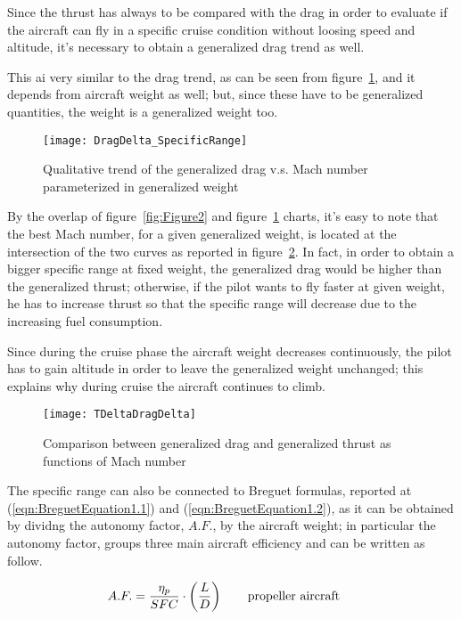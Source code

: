 \bigskip
\noindent
Since the thrust has always to be compared with the drag in order to evaluate if the aircraft can fly in a specific cruise condition without loosing speed and altitude, it's necessary to obtain a generalized drag trend as well. 

This ai very similar to the drag trend, as can be seen from figure~\ref{fig:Figure3}, and it depends from aircraft weight as well; but, since these have to be generalized quantities, the weight is a generalized weight too.

\begin{figure}[b]
\centering
\texttt{[image: DragDelta\_SpecificRange]}
\caption{Qualitative trend of the generalized drag v.s. Mach number parameterized in generalized weight}
\label{fig:Figure3}
\end{figure}

\bigskip
\noindent
By the overlap of figure~\ref{fig:Figure2} and figure~\ref{fig:Figure3} charts, it's easy to note that the best Mach number, for a given generalized weight, is located at the intersection of the two curves as reported in figure~\ref{fig:Figure4}. In fact, in order to obtain a bigger specific range at fixed weight, the generalized drag would be higher than the generalized thrust; otherwise, if the pilot wants to fly faster at given weight, he has to increase thrust so that the specific range will decrease due to the increasing fuel consumption.

Since during the cruise phase the aircraft weight decreases continuously, the pilot has to gain altitude in order to leave the generalized weight unchanged; this explains why during cruise the aircraft continues to climb. 

\begin{figure}[t]
\centering
\texttt{[image: TDeltaDragDelta]}
\caption{Comparison between generalized drag and generalized thrust as functions of Mach number}
\label{fig:Figure4}
\end{figure}

\bigskip
\noindent
The specific range can also be connected to Breguet formulas, reported at (\ref{eqn:BreguetEquation1.1}) and (\ref{eqn:BreguetEquation1.2}), as it can be obtained by dividng the autonomy factor, $A.F.$, by the aircraft weight; in particular the autonomy factor, groups three main aircraft efficiency and can be written as follow.

\begin{eqnarray}
A.F.=\frac{\eta_{p}}{SFC}\cdot\left(\frac{L}{D}\right) %
\qquad \textrm {\parbox[t][][t]{.25\linewidth} {propeller aircraft}}
\label{eqn:A.F.Equation4}
\end{eqnarray}


